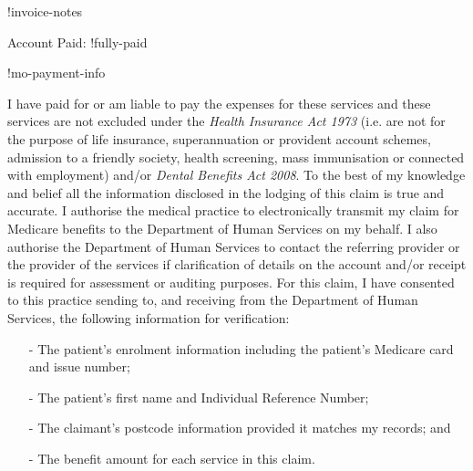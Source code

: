 \documentclass[12pt]{article}
\begin{document}
!invoice-notes

\vspace{3mm}

Account Paid: !fully-paid

\begin{spacing}{0.3}

\vspace{3mm}
  
  {\footnotesize

    !mo-payment-info} 

 \vspace{3mm}

{\tiny
 
I have paid for or am liable to pay the expenses for these services and these services are not excluded under the \emph{Health Insurance Act 1973} (i.e. are not for the purpose of life insurance, superannuation or provident account schemes, admission to a friendly society, health screening, mass immunisation or connected with employment) and/or \emph{Dental Benefits Act 2008}. To the best of my knowledge and belief all the information disclosed in the lodging of this claim is true and accurate. I authorise the medical practice to electronically transmit my claim for Medicare benefits to the Department of Human Services on my behalf. I also authorise the Department of Human Services to contact the referring provider or the provider of the services if clarification of details on the account and/or receipt is required for assessment or auditing purposes. 
For this claim, I have consented to this practice sending to, and receiving from the Department of Human Services, the following information for verification:

\vspace{1mm}

\begin{itemize}[noitemsep,nolistsep]
  \item[-] The patient’s enrolment information including the patient’s Medicare card and issue number; 
  \item[-] The patient’s first name and Individual Reference Number; 
  \item[-] The claimant’s postcode information provided it matches my records; and 
  \item[-] The benefit amount for each service in this claim.
\end{itemize}

\vspace{1mm}

}
\end{spacing}
\end{document}
